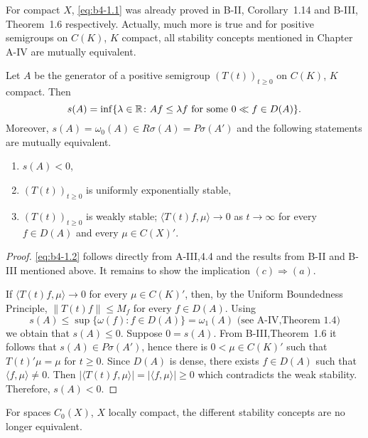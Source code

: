 For compact $X$, \eqref{eq:b4-1.1} was already proved in B-II, Corollary~1.14 and B-III, Theorem~1.6 respectively. 
Actually, much more is true and for positive semigroups on $C(K)$, $K$ compact, all stability concepts mentioned in Chapter A-IV are mutually equivalent.

\begin{theorem}\label{thm:b4-1.1}%
Let $A$ be the generator of a positive semigroup $(T(t))_{t \geq 0}$ on $C(K)$, $K$ compact. Then
\begin{equation}\label{eq:b4-1.2}
   s(A) = \inf \{\lambda \in \mathbb{R} \colon Af \leq \lambda f \text{ for some } 0 \ll f \in D(A)\} .
\end{equation}
Moreover, $s(A) = \omega_{0}(A) \in R\sigma(A) = P\sigma(A')$ and the following statements are mutually equivalent.
\begin{enumerate}[\upshape (a)]
\item $s(A) < 0$,
\item $(T(t))_{t \geq 0}$ is uniformly exponentially stable,
\item $(T(t))_{t \geq 0}$ is weakly stable; \ie $\langle T(t)f,\mu \rangle \to 0$ as $t \to \infty$ for every $f \in D(A)$ and every $\mu \in C(X)'$.
\end{enumerate}
\end{theorem}
\begin{proof}
\eqref{eq:b4-1.2} follows directly from A-III,4.4 and the results from B-II and B-III mentioned above. 
It remains to show the implication $(c) \Rightarrow (a)$.

If $\langle T(t)f,\mu \rangle \to 0$ for every $\mu \in C(K)'$, then, by the Uniform Boundedness Principle, $\|T(t)f\| \leq M_f$ for every $f \in D(A)$.
Using 
\[
s(A) \leq \sup \{\omega(f)\colon f \in D(A)\} = \omega_1(A)
\text{ (see A-IV,Theorem~1.4)}
\]
we obtain that $s(A) \leq 0$. 
Suppose $0 = s(A)$. 
From B-III,Theorem~1.6 it follows that $s(A) \in P\sigma(A')$, hence there is $0 < \mu \in C(K)'$ such that $T(t)'\mu = \mu$ for $t \geq 0$. 
Since $D(A)$ is dense, there exists $f \in D(A)$ such that $\langle f,\mu \rangle \neq 0$. 
Then $|\langle T(t)f,\mu \rangle| = |\langle f,\mu \rangle|  \ge  0$ which contradicts the weak stability. Therefore, $s(A) < 0$.
\end{proof}
For spaces $C_{0}(X)$, $X$ locally compact, the different stability concepts are no longer equivalent.


